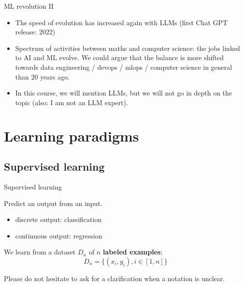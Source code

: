 \documentclass[usenames,dvipsnames]{beamer}
\begin{document}
\begin{frame}{ML revolution II}

    \begin{itemize}
	\item The speed of evolution has increased again with LLMs (first Chat GPT release: 2022)
	\item Spectrum of activities between maths and computer science: the jobs linked to AI and ML evolve. We could argue that the balance is more shifted towards data engineering / devops / mlops / computer science in general
	    than 20 years ago.
	\item In this course, we will mention LLMs, but we will not go in depth on the topic (also: I am not an LLM expert).
    \end{itemize}

\end{frame}


\section{Learning paradigms}
\frame{\tableofcontents[currentsection]}

\subsection{Supervised learning}%
\label{sub:supervised_learning}

\begin{frame}{Supervised learning}

    Predict an output from an input.
    \begin{itemize}
    	\item discrete output: classification
	\item continuous output: regression
    \end{itemize}

    We learn from a dataset $D_n$ of $n$ \textbf{labeled examples}; 
\begin{equation}
    D_n =\{(x_i,y_i), i\in[1, n]\}
\end{equation}

    Please do not hesitate to ask for a clarification when a notation is unclear.
\end{frame}
\end{document}
